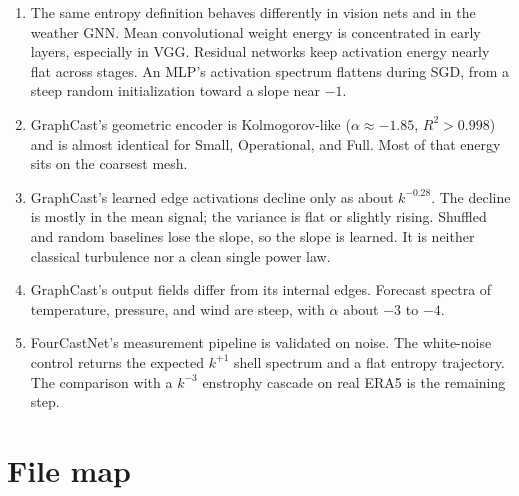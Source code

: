 \documentclass[11pt,a4paper]{article}
\begin{document}
\begin{enumerate}
  \item The same entropy definition behaves differently in vision nets and in the weather GNN.
  Mean convolutional weight energy is concentrated in early layers, especially in VGG.
  Residual networks keep activation energy nearly flat across stages.
  An MLP's activation spectrum flattens during SGD, from a steep random initialization toward a slope near \(-1\).

  \item GraphCast's geometric encoder is Kolmogorov-like (\(\alpha \approx -1.85\), \(R^2 > 0.998\)) and is almost identical for Small, Operational, and Full.
  Most of that energy sits on the coarsest mesh.

  \item GraphCast's learned edge activations decline only as about \(k^{-0.28}\).
  The decline is mostly in the mean signal; the variance is flat or slightly rising.
  Shuffled and random baselines lose the slope, so the slope is learned.
  It is neither classical turbulence nor a clean single power law.

  \item GraphCast's output fields differ from its internal edges.
  Forecast spectra of temperature, pressure, and wind are steep, with \(\alpha\) about \(-3\) to \(-4\).

  \item FourCastNet's measurement pipeline is validated on noise.
  The white-noise control returns the expected \(k^{+1}\) shell spectrum and a flat entropy trajectory.
  The comparison with a \(k^{-3}\) enstrophy cascade on real ERA5 is the remaining step.
\end{enumerate}

\appendix
\section{File map}
\end{document}
